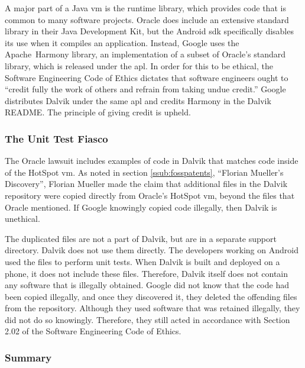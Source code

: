 \documentclass[11pt]{article}
\begin{document}
\begin{multicols}{2}
A major part of a Java \gls{vm} is the runtime \gls{library}, which provides
code that is common to many software projects.  Oracle does include an extensive
standard \gls{library} in their Java Development Kit, but the Android \gls{sdk}
specifically disables its use when it compiles an application.  Instead, Google
uses the Apache~Harmony \gls{library}, an implementation of a subset of Oracle's
standard \gls{library}, which is released under the \gls{apl}.
\cite{apache-harmony} \cite{dalvik-readme} In order for this to be ethical, the
Software Engineering Code of Ethics dictates that software engineers ought to
``credit fully the work of others and refrain from taking undue credit.''
\cite[\S7.03]{secode}  Google distributes Dalvik under the same \gls{apl} and
credits Harmony in the Dalvik README.  \cite{dalvik-readme}  The principle of
giving credit is upheld.

\subsubsection{The Unit Test Fiasco} %
\label{ssub:unittest-fiasco}

The Oracle lawsuit includes examples of code in Dalvik that matches code inside
of the HotSpot \gls{vm}. \cite{exhibitj} As noted in section
\ref{ssub:fosspatents}, ``Florian Mueller's Discovery'', Florian Mueller made
the claim that additional files in the Dalvik repository were copied directly
from Oracle's HotSpot \gls{vm}, beyond the files that Oracle mentioned.
\cite{fosspatents}  If Google knowingly copied code illegally, then Dalvik is
unethical.

The duplicated files are not a part of Dalvik, but are in a separate support
directory.  Dalvik does not use them directly.  The developers working on
Android used the files to perform unit tests.  When Dalvik is built and deployed
on a phone, it does not include these files. \cite{zdnet-copying} Therefore,
Dalvik itself does not contain any software that is illegally obtained.  Google
did not know that the code had been copied illegally, and once they discovered
it, they deleted the offending files from the repository.  Although they used
software that was retained illegally, they did not do so knowingly.  Therefore,
they still acted in accordance with Section 2.02 of the Software Engineering
Code of Ethics.


\subsubsection{Summary} %
\label{ssub:licensing-summary}


\end{multicols}
\end{document}
